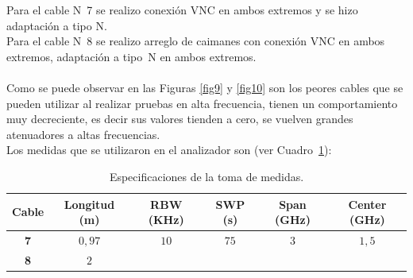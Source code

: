 \documentclass[12pt,graphicx,caption,rotating]{article}
\begin{document}
\noindent
Para el cable N~7 se realizo conexión VNC en ambos extremos y se hizo adaptación a tipo N.\\
Para el cable N~8 se realizo arreglo de caimanes con conexión VNC en ambos extremos, adaptación a tipo~N en ambos extremos.\\\\
Como se puede observar en las Figuras \ref{fig9} y \ref{fig10} son los peores cables que se pueden utilizar al realizar pruebas en alta frecuencia, tienen un comportamiento muy decreciente, es decir sus valores tienden a cero, se vuelven grandes atenuadores a altas frecuencias.\\
Los medidas que se utilizaron en el analizador son (ver Cuadro~\ref{tab5}):
\begin{table}[H]
  \centering
  \caption{Especificaciones de la toma de medidas.}
  \begin{tabular}{|c|c|c|c|c|c|}\hline
    \textbf{Cable } & \textbf{Longitud (m) } & \textbf{RBW (KHz) } & \textbf{SWP (s) } & \textbf{Span (GHz) } & \textbf{Center (GHz) } \\ \hline
    \textbf{7} & $0,97 $ & \multicolumn{ 1}{c|}{$10$} & \multicolumn{ 1}{c|}{$75$} & \multicolumn{ 1}{c|}{$3$} & \multicolumn{ 1}{c|}{$1,5 $} \\ \cline{ 1- 2}
    \textbf{8} & $2$ & \multicolumn{ 1}{c|}{} & \multicolumn{ 1}{c|}{} & \multicolumn{ 1}{c|}{} & \multicolumn{ 1}{c|}{} \\ \hline
  \end{tabular}
    \label{tab5}
\end{table}
\end{document}
